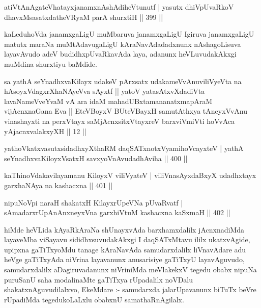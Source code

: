 
\begin{shl}
atiVtAnAgateVhatayxjanamxnAshAdiheVtunutf |
yasutx dhiVpUvaRkoV dhavxMsasatxdatheVRyaM parA shurxtiH \hfill || 399 ||
\end{shl}

\begin{artha}
kaLeduhoVda janamxgaLigU muMbaruva janamxgaLigU Igiruva janamxgaLigU matutx maraNa muMtAdavugaLigU kAraNavAdadadxnunx nAshagoLisuva layavAvudo adeV budidhxpUvaRkavAda laya, adanunx heVLuvudakAkxgi muMdina shurxtiyu baMdide.
\end{artha}


\begin{shl}
sa yathA seYnadhxvaKilayx udakeV pArxsatx udakameVvAnuviliVyeVta na hAsoyxVdagxrXhaNAyeVva sAyxtf || yatoV yatasAtxvXdadiVta lavaNameVveYvaM vA ara idaM mahadUBxtamananatxmapAraM vijAcnxnaGana Eva || EteVBoyxV BUteVBayxH samutAthxya tAneyxVvAnu vinashayxti na perxVtayx saMjAcnxsitxVtayxreV barxviVmiVti hoVvAca yAjacnxvalakxyXH || 12 ||
\end{shl}

\begin{shl}
yathoVkatxvasutxsidadhxyXthaRM daqSATxnotxV\s yamihoVcayxteV |
yathA seYnadhxvaKiloyxV\s satxH savxyoVnAvudadhAviha \hfill || 400 ||
\end{shl}

\begin{shl}
kaThinoVdakavilayamanu KiloyxV viliVyateV |
viliVnasAyxdaBxyX udadhxtayx garxhaNAya na kashacxna \hfill || 401 ||
\end{shl}

\begin{shl}
nipuNoV\s pi naraH shakatxH KilayxrUpeVNa pUvaRvatf |
sAmadarxrUpAnAnxneyxVna garxhiVtuM kashacxna kaSxmaH \hfill || 402 ||
\end{shl}

\begin{artha}
hiMde heVLida kAyaRkAraNa shUnayxvAda barxhamxdalilx jAcnxnadiMda layaveMba viSayavu sididhxsuvudakAkxgi I daqSATxMtavu ililx ukatxvAgide, upipxna gaTiTxyoMdu tanage kAraNavAda samudarxdalilx liVnavAdare adu heVge gaTiTxyAda niVrina layavanunx anusarisiye gaTiTxyU layavAguvudo, samudarxdalilx aDagiruvadanunx niVriniMda meVlakekxV tegedu obabx nipuNa puruSanU saha modalinaMte gaTiTxya rUpadalilx noVDalu shakatxnAguvudilalxvo, EkeMdare :- samudarxda jalarUpavanunx biTuTx beVre rUpadiMda tegedukoLaLxlu obabxnU samathaRnAgilalx.
\end{artha}

